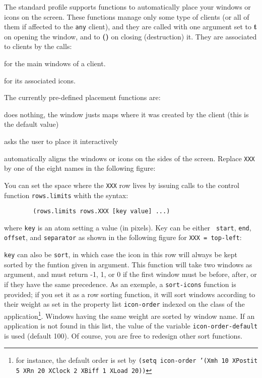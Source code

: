 \label{set-placement}
The standard profile supports functions to automatically place your windows
or icons on the screen. These functions manage only some type of clients (or
all of them if affected to the \verb"any" client), and they are called
with one argument set to {\bf t} on opening the window, and to {\bf ()} on
closing (destruction) it. They are associated to clients by the calls:

\begin{description}

 for the
main windows of a client. 

 for
its associated icons.

\end{description}

The currently pre-defined placement functions are:

\begin{description}

\itemtt{()} does nothing, the window justs maps where it was created
by the client (this is the default value)

 asks the user to place it interactively

 automatically aligns the windows or icons on the
sides of the screen. Replace {\tt XXX} by one of the eight names in the 
following figure:

\centerline{}

You can set the space where the {\tt XXX} row lives by issuing calls to the
control function \verb"rows.limits" whith the syntax:

\begin{verbatim}
        (rows.limits rows.XXX [key value] ...)
\end{verbatim}

where {\tt key} is an atom setting a value (in pixels). Key can be either {\tt
start}, {\tt end}, {\tt offset}, and {\tt separator} as shown in the following
figure for {\tt XXX = top-left}:

\centerline{}

{\tt key} can also be {\tt sort}, in which case the icon in this row will
always be kept sorted by the funtion given in argument. This function will
take two windows as argument, and must return -1, 1, or 0 if the first window
must be before, after, or if they have the same precedence. As an exemple, a
{\tt sort-icons} function is provided; if you set it as a row sorting
function, it will sort windows according to their weight as set in the
property list {\tt icon-order} indexed on the class of the
application\footnote{for instance, the default order is set by {\tt (setq
icon-order '(Xmh 10 XPostit 5 XRn 20 XClock 2 XBiff 1 XLoad 20))}}. Windows
having the same weight are sorted by window name. If an application is not
found in this list, the value of the variable {\tt icon-order-default} is used
(default 100). Of course, you are free to redesign other sort functions.

\end{description}

